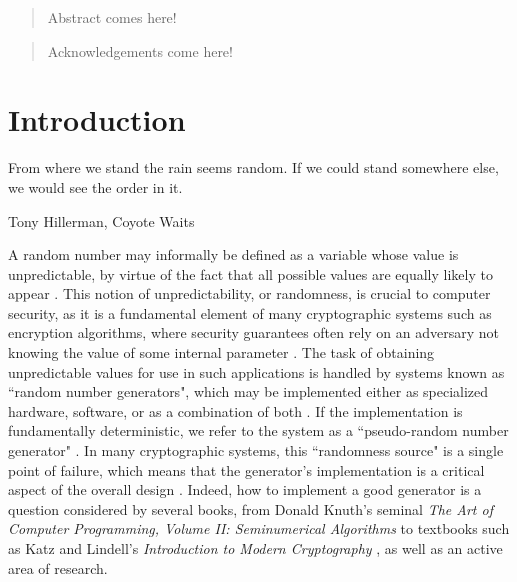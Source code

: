 \documentclass[12pt, titlepage]{report}
\theoremstyle{definition}
\begin{document}

\begin{abstract}
Abstract comes here!
\end{abstract}


\renewcommand{\abstractname}{Acknowledgements}
\begin{abstract}
Acknowledgements come here!
\end{abstract}



\tableofcontents
\clearpage



\chapter{Introduction}
\epigraph{From where we stand the rain seems random. If we could stand somewhere else, we would see the order in it.}{Tony Hillerman, Coyote Waits}

A random number may informally be defined as a variable whose value is unpredictable, by virtue of the fact that all possible values are equally likely to appear \cite[p. 7]{barker2007recommendation}. This notion of unpredictability, or randomness, is crucial to computer security, as it is a fundamental element of many cryptographic systems such as encryption algorithms, where security guarantees often rely on an adversary not knowing the value of some internal parameter \cite[p. 169]{menezes1996handbook} \cite[p. 1]{kelsey1998cryptanalytic}. The task of obtaining unpredictable values for use in such applications is handled by systems known as ``random number generators", which may be implemented either as specialized hardware, software, or as a combination of both \cite[p. 196, 172]{menezes1996handbook}. If the implementation is fundamentally deterministic, we refer to the system as a ``pseudo-random number generator" \cite[p. 169]{menezes1996handbook}. In many cryptographic systems, this ``randomness source" is a single point of failure, which means that the generator's implementation is a critical aspect of the overall design \cite[p. 2]{kelsey1998cryptanalytic}. Indeed, how to implement a good generator is a question considered by several books, from Donald Knuth's seminal \textit{The Art of Computer Programming, Volume II: Seminumerical Algorithms} \cite{donald1998art} to textbooks such as Katz and Lindell's \textit{Introduction to Modern Cryptography} \cite{katz2014introduction}, as well as an active area of research.
\end{document}
